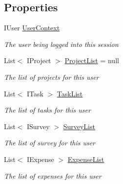 \subsection*{Properties}
\begin{DoxyCompactItemize}
\item 
I\+User \hyperlink{class_plex_byte_1_1_mo_cap_1_1_managers_1_1_object_manager_a7dc127d831f7cfe4d8176ed6f28c7fb0}{User\+Context}
\begin{DoxyCompactList}\small\item\em The user being logged into this session \end{DoxyCompactList}\item 
List$<$ I\+Project $>$ \hyperlink{class_plex_byte_1_1_mo_cap_1_1_managers_1_1_object_manager_ae2a4180caef79d7316b897f09eecfdd1}{Project\+List} = null
\begin{DoxyCompactList}\small\item\em The list of projects for this user \end{DoxyCompactList}\item 
List$<$ I\+Task $>$ \hyperlink{class_plex_byte_1_1_mo_cap_1_1_managers_1_1_object_manager_a92a1c2e486fc1ecaeb361985421910c8}{Task\+List}
\begin{DoxyCompactList}\small\item\em The list of tasks for this user \end{DoxyCompactList}\item 
List$<$ I\+Survey $>$ \hyperlink{class_plex_byte_1_1_mo_cap_1_1_managers_1_1_object_manager_adb0e69918a06be755e9f8e18c8739a7c}{Survey\+List}
\begin{DoxyCompactList}\small\item\em The list of survey for this user \end{DoxyCompactList}\item 
List$<$ I\+Expense $>$ \hyperlink{class_plex_byte_1_1_mo_cap_1_1_managers_1_1_object_manager_a47a98a677993d2028d756bb368ede9d9}{Expense\+List}
\begin{DoxyCompactList}\small\item\em The list of expenses for this user \end{DoxyCompactList}\item 

\end{DoxyCompactItemize}
